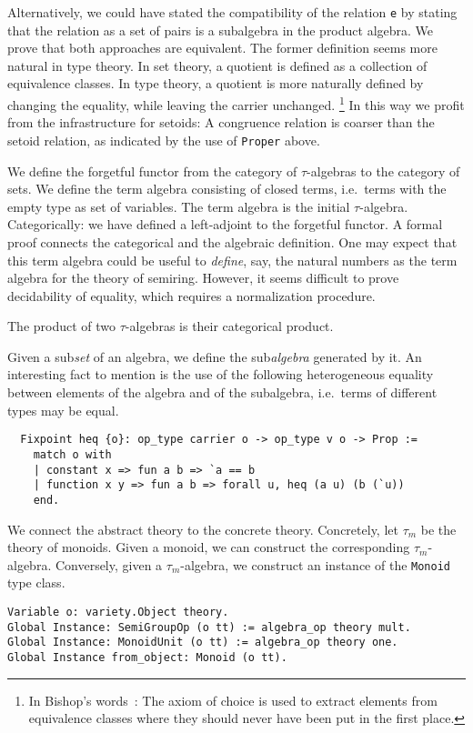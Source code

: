 \documentclass[a4paper,10pt,runningheads]{llncs}
\begin{document}
Alternatively, we could have stated the compatibility of the relation \lstinline|e| by stating that the
relation as a set of pairs is a subalgebra in the product algebra. We prove that both approaches
are equivalent. The former definition seems more natural in type theory. In set theory, a quotient
is defined as a collection of equivalence classes. In type theory, a quotient is more naturally
defined by changing the equality, while leaving the carrier unchanged.%
\footnote{In Bishop's words~\cite[p.12]{Bishop/Bridges:1985}: The axiom of choice is used to extract
elements from equivalence classes where they should never have been put in the first place.}
 In this way we profit from the infrastructure for setoids: A congruence relation is coarser than the setoid relation, as indicated by the use of \lstinline|Proper| above.

We define the forgetful functor from the category of $\tau$-algebras to the category of sets.
We define the term algebra consisting of closed terms, i.e.\ terms with the empty type as set of
variables. The term algebra is the initial $\tau$-algebra. Categorically: we have defined a
left-adjoint to the forgetful functor.
A formal proof connects the categorical and the algebraic definition.
One may expect that this term algebra could be useful to
\emph{define}, say, the natural numbers as the term algebra for the theory of semiring. However, it
seems difficult to prove decidability of equality, which requires a normalization procedure.

The product of two $\tau$-algebras is their categorical product.

Given a sub\emph{set} of an algebra, we define the sub\emph{algebra} generated by it.
An interesting fact to mention is the use of the following heterogeneous equality between
elements of the algebra and of the subalgebra, i.e.\ terms of different types may be equal.
\begin{lstlisting}
  Fixpoint heq {o}: op_type carrier o -> op_type v o -> Prop :=
    match o with
    | constant x => fun a b => `a == b
    | function x y => fun a b => forall u, heq (a u) (b (`u))
    end.
\end{lstlisting}


We connect the abstract theory to the concrete theory. Concretely, let $\tau_m$ be the theory
of monoids. Given a monoid, we can construct the corresponding $\tau_m$-algebra. 
Conversely, given a $\tau_m$-algebra, we construct an instance of the \lstinline|Monoid| type class.
\begin{lstlisting}
Variable o: variety.Object theory.
Global Instance: SemiGroupOp (o tt) := algebra_op theory mult.
Global Instance: MonoidUnit (o tt) := algebra_op theory one.
Global Instance from_object: Monoid (o tt).
\end{lstlisting}
\end{document}
